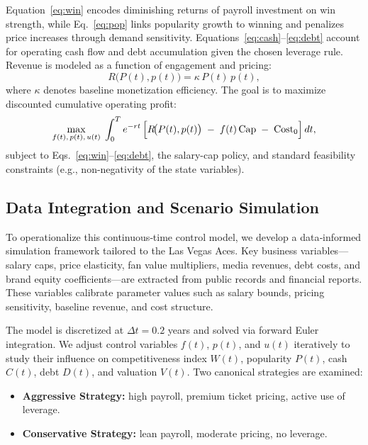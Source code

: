 \documentclass[12pt]{article}
\numberwithin{figure}{section}
\numberwithin{table}{section}
\begin{document}
	Equation~\eqref{eq:win} encodes diminishing returns of payroll investment on win strength, while Eq.~\eqref{eq:pop} links popularity growth to winning and penalizes price increases through demand sensitivity. 
	Equations~\eqref{eq:cash}--\eqref{eq:debt} account for operating cash flow and debt accumulation given the chosen leverage rule. 
	Revenue is modeled as a function of engagement and pricing:
	\begin{equation}
		R\!\bigl(P(t),p(t)\bigr) = \kappa\,P(t)\,p(t), \label{eq:revenue}
	\end{equation}
	where $\kappa$ denotes baseline monetization efficiency.
	\vspace{-0.5em}
	The goal is to maximize discounted cumulative operating profit:
	\begin{equation}
		\max_{f(t),\,p(t),\,u(t)} \;\int_{0}^{T} e^{-rt}\,\Bigl[R\!\bigl(P(t),p(t)\bigr)\;-\;f(t)\,\mathrm{Cap}\;-\;\mathrm{Cost}_0\Bigr]\,dt,
		\label{eq:objective}
	\end{equation}
	subject to Eqs.~\eqref{eq:win}--\eqref{eq:debt}, the salary-cap policy, and standard feasibility constraints (e.g., non-negativity of the state variables).
	
	
	
	\subsection{Data Integration and Scenario Simulation}
	
	To operationalize this continuous‑time control model, we develop a data‑informed simulation framework tailored to the Las Vegas Aces. Key business variables—salary caps, price elasticity, fan value multipliers, media revenues, debt costs, and brand equity coefficients—are extracted from public records and financial reports. These variables calibrate parameter values such as salary bounds, pricing sensitivity, baseline revenue, and cost structure.
	
	The model is discretized at $\Delta t=0.2$ years and solved via forward Euler integration. We adjust control variables $f(t)$, $p(t)$, and $u(t)$ iteratively to study their influence on competitiveness index $W(t)$, popularity $P(t)$, cash $C(t)$, debt $D(t)$, and valuation $V(t)$.
	 Two canonical strategies are examined:
	
	\begin{itemize}
		\item \textbf{Aggressive Strategy:} high payroll, premium ticket pricing, active use of leverage.
		\vspace{-0.5em}
		\item \textbf{Conservative Strategy:} lean payroll, moderate pricing, no leverage.
	\end{itemize}
\end{document}
